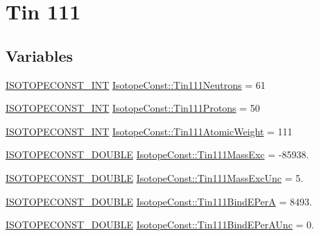 \hypertarget{group___isotope_const-_tin-_sn111}{}\section{Tin 111}
\label{group___isotope_const-_tin-_sn111}
\subsection*{Variables}
\begin{DoxyCompactItemize}
\item 
\mbox{\hyperlink{group___isotope_const-_macros_ga5f18360b3e99483a35c32d789e62621c}{I\+S\+O\+T\+O\+P\+E\+C\+O\+N\+S\+T\+\_\+\+I\+NT}} \mbox{\hyperlink{group___isotope_const-_tin-_sn111_ga6d0bf4e1b77f0a058efe02e08d6591f8}{Isotope\+Const\+::\+Tin111\+Neutrons}} = 61
\item 
\mbox{\hyperlink{group___isotope_const-_macros_ga5f18360b3e99483a35c32d789e62621c}{I\+S\+O\+T\+O\+P\+E\+C\+O\+N\+S\+T\+\_\+\+I\+NT}} \mbox{\hyperlink{group___isotope_const-_tin-_sn111_ga1412dec0bae39296332cf1b7908ee4ff}{Isotope\+Const\+::\+Tin111\+Protons}} = 50
\item 
\mbox{\hyperlink{group___isotope_const-_macros_ga5f18360b3e99483a35c32d789e62621c}{I\+S\+O\+T\+O\+P\+E\+C\+O\+N\+S\+T\+\_\+\+I\+NT}} \mbox{\hyperlink{group___isotope_const-_tin-_sn111_ga9416cbdecc652ba23fcefb515c872b38}{Isotope\+Const\+::\+Tin111\+Atomic\+Weight}} = 111
\item 
\mbox{\hyperlink{group___isotope_const-_macros_ga8f45a7272ce02c0b4c65c44636ed719a}{I\+S\+O\+T\+O\+P\+E\+C\+O\+N\+S\+T\+\_\+\+D\+O\+U\+B\+LE}} \mbox{\hyperlink{group___isotope_const-_tin-_sn111_gae317dfcb5d917644ebd339b86a1a8a5f}{Isotope\+Const\+::\+Tin111\+Mass\+Exc}} = -\/85938.
\item 
\mbox{\hyperlink{group___isotope_const-_macros_ga8f45a7272ce02c0b4c65c44636ed719a}{I\+S\+O\+T\+O\+P\+E\+C\+O\+N\+S\+T\+\_\+\+D\+O\+U\+B\+LE}} \mbox{\hyperlink{group___isotope_const-_tin-_sn111_gaeb0e9be3771ffe1d7a0601207db0cc1d}{Isotope\+Const\+::\+Tin111\+Mass\+Exc\+Unc}} = 5.
\item 
\mbox{\hyperlink{group___isotope_const-_macros_ga8f45a7272ce02c0b4c65c44636ed719a}{I\+S\+O\+T\+O\+P\+E\+C\+O\+N\+S\+T\+\_\+\+D\+O\+U\+B\+LE}} \mbox{\hyperlink{group___isotope_const-_tin-_sn111_ga835930bf7cd8ae9af00fcdd76391db35}{Isotope\+Const\+::\+Tin111\+Bind\+E\+PerA}} = 8493.
\item 
\mbox{\hyperlink{group___isotope_const-_macros_ga8f45a7272ce02c0b4c65c44636ed719a}{I\+S\+O\+T\+O\+P\+E\+C\+O\+N\+S\+T\+\_\+\+D\+O\+U\+B\+LE}} \mbox{\hyperlink{group___isotope_const-_tin-_sn111_ga608fa50d9d37238c0ad8a738178de3d4}{Isotope\+Const\+::\+Tin111\+Bind\+E\+Per\+A\+Unc}} = 0.

\end{DoxyCompactItemize}
